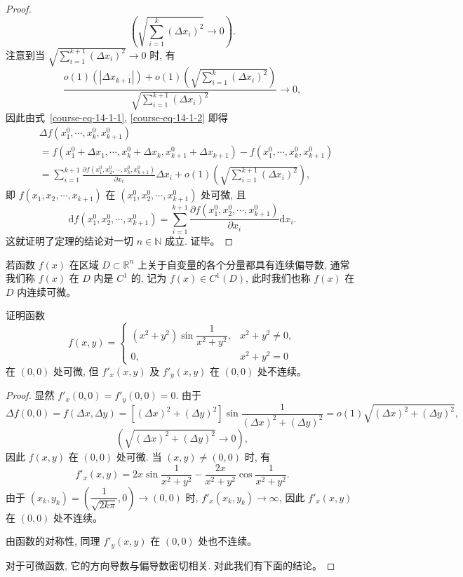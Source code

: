 \documentclass[12pt,fontset=fandol]{ctexart}
\begin{document}
\begin{proof}
\[
  \left(\sqrt{\sum_{i=1}^k(\Delta x_i)^2}\to0\right).
\]
注意到当 $\sqrt{\sum\limits_{i=1}^{k+1}(\Delta x_i)^2}\to0$ 时, 有
\[
  \frac{
  o(1)(|\Delta x_{k+1}|)
  +o(1)\left(\sqrt{\sum\limits_{i=1}^k(\Delta x_i)^2}\right)}
  {\sqrt{\sum\limits_{i=1}^{k+1}(\Delta x_i)^2}}\to0,
\]
因此由式~\eqref{course-eq-14-1-1}, \eqref{course-eq-14-1-2}  即得
\[
\begin{aligned}
&\Delta f(x_1^0,\cdots,x_k^0,x_{k+1}^0)\\
&=
  f(x_1^0+\Delta x_1,\cdots,x_k^0+\Delta x_k,x_{k+1}^0+\Delta x_{k+1})
  -f(x_1^0,\cdots,x_k^0,x_{k+1}^0)\\
&=\sum_{i=1}^{k+1}
  \frac{\partial f(x_1^0,x_2^0,\cdots,x_k^0,x_{k+1}^0)}{\partial x_i}\Delta x_i
  +o(1)\left(\sqrt{\sum_{i=1}^{k+1}(\Delta x_i)^2}\right),
\end{aligned}
\]
即 $f(x_1,x_2,\cdots,x_{k+1})$ 在 $(x_1^0,x_2^0,\cdots,x_{k+1}^0)$ 处可微, 且
\[
  \mathrm df(x_1^0,x_2^0,\cdots,x_{k+1}^0)
  =\sum_{i=1}^{k+1}
  \frac{\partial f(x_1^0,x_2^0,\cdots,x_{k+1}^0)}{\partial x_i}\mathrm dx_i.
\]
这就证明了定理的结论对一切 $n\in\mathbb N$ 成立. 证毕。

\end{proof}
\begin{remark}\quad 若函数 $f(x)$ 在区域 $D\subset\mathbb R^n$ 上关于自变量的各个分量都具有连续偏导数, 通常我们称 $f(x)$ 在 $D$ 内是 $C^1$ 的, 记为 $f(x)\in C^1(D)$, 此时我们也称 $f(x)$ 在 $D$ 内连续可微。

\end{remark}
\begin{example}\label{course-example-14-1-5}\quad 证明函数
\[
  f(x,y)=
  \begin{cases}
    (x^2+y^2)\sin\dfrac1{x^2+y^2}, & x^2+y^2\ne0,\\
    0, & x^2+y^2=0
  \end{cases}
\]
在 $(0,0)$ 处可微, 但 $f'_x(x,y)$ 及 $f'_y(x,y)$ 在 $(0,0)$ 处不连续。

\end{example}
\begin{proof}\quad 显然 $f'_x(0,0)=f'_y(0,0)=0$. 由于
\[
  \Delta f(0,0)=f(\Delta x,\Delta y)
  =[(\Delta x)^2+(\Delta y)^2]\sin\frac1{(\Delta x)^2+(\Delta y)^2}
  =o(1)\sqrt{(\Delta x)^2+(\Delta y)^2},
\]
\[
  \left(\sqrt{(\Delta x)^2+(\Delta y)^2}\to0\right),
\]
因此 $f(x,y)$ 在 $(0,0)$ 处可微. 当 $(x,y)\ne(0,0)$ 时, 有
\[
  f'_x(x,y)=2x\sin\frac1{x^2+y^2}-\frac{2x}{x^2+y^2}\cos\frac1{x^2+y^2}.
\]
由于 $(x_k,y_k)=\left(\dfrac1{\sqrt{2k\pi}},0\right)\to(0,0)$ 时, $f'_x(x_k,y_k)\to\infty$, 因此 $f'_x(x,y)$ 在 $(0,0)$ 处不连续。

由函数的对称性, 同理 $f'_y(x,y)$ 在 $(0,0)$ 处也不连续。

对于可微函数, 它的方向导数与偏导数密切相关. 对此我们有下面的结论。

\end{proof}
\end{document}
